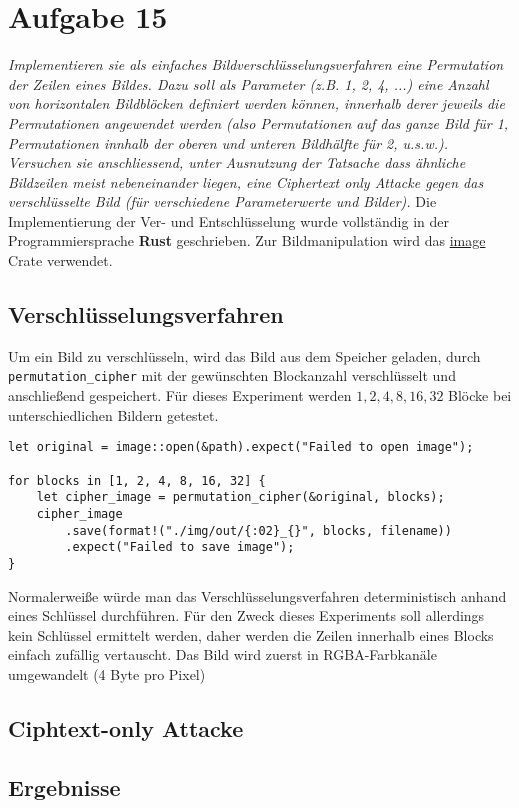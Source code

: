 \section{Aufgabe 15}
\textit{Implementieren sie als einfaches Bildverschlüsselungsverfahren eine Permutation der
Zeilen eines Bildes. Dazu soll als Parameter (z.B. 1, 2, 4, ...) eine Anzahl von
horizontalen Bildblöcken definiert werden können, innerhalb derer jeweils die Permutationen angewendet werden (also Permutationen auf das ganze Bild für 1, Permutationen innhalb der oberen und unteren Bildhälfte für 2, u.s.w.). Versuchen
sie anschliessend, unter Ausnutzung der Tatsache dass ähnliche Bildzeilen meist
nebeneinander liegen, eine Ciphertext only Attacke gegen das verschlüsselte Bild
(für verschiedene Parameterwerte und Bilder).}\vspace*{1em}\newline
Die Implementierung der Ver- und Entschlüsselung wurde vollständig in der Programmiersprache
\textbf{Rust} geschrieben. Zur Bildmanipulation wird das \href{https://docs.rs/image/latest/image/}{image} Crate verwendet. 
\subsection{Verschlüsselungsverfahren}
Um ein Bild zu verschlüsseln, wird das Bild aus dem Speicher geladen, durch \verb|permutation_cipher| mit der
gewünschten Blockanzahl verschlüsselt und anschließend gespeichert. Für
dieses Experiment werden $1,2,4,8,16,32$ Blöcke bei unterschiedlichen Bildern getestet. 
\begin{verbatim}
let original = image::open(&path).expect("Failed to open image");

for blocks in [1, 2, 4, 8, 16, 32] {
    let cipher_image = permutation_cipher(&original, blocks);
    cipher_image
        .save(format!("./img/out/{:02}_{}", blocks, filename))
        .expect("Failed to save image");
}
\end{verbatim}
Normalerweiße würde man das Verschlüsselungsverfahren deterministisch anhand eines
Schlüssel durchführen. Für den Zweck dieses Experiments soll allerdings 
kein Schlüssel ermittelt werden, daher werden die Zeilen innerhalb eines Blocks
einfach zufällig vertauscht. Das Bild wird zuerst in RGBA-Farbkanäle umgewandelt (4 Byte pro Pixel)

\subsection{Ciphtext-only Attacke}
\subsection{Ergebnisse}